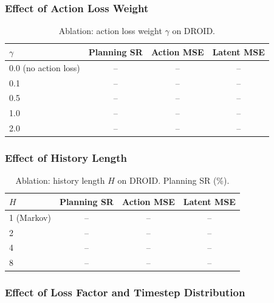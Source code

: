 \documentclass{article}
\begin{document}
\subsubsection{Effect of Action Loss Weight}

\begin{table}[t]
\centering
\caption{Ablation: action loss weight $\gamma$ on DROID.}
\label{tab:ablation_gamma}
\begin{tabular}{lccc}
\toprule
$\gamma$ & \textbf{Planning SR} & \textbf{Action MSE} & \textbf{Latent MSE} \\
\midrule
0.0 (no action loss)  & -- & -- & -- \\
0.1                    & -- & -- & -- \\
0.5                    & -- & -- & -- \\
1.0                    & -- & -- & -- \\
2.0                    & -- & -- & -- \\
\bottomrule
\end{tabular}
\end{table}

\subsubsection{Effect of History Length}

\begin{table}[t]
\centering
\caption{Ablation: history length $H$ on DROID. Planning SR (\%).}
\label{tab:ablation_history}
\begin{tabular}{lccc}
\toprule
$H$ & \textbf{Planning SR} & \textbf{Action MSE} & \textbf{Latent MSE} \\
\midrule
1 (Markov)  & -- & -- & -- \\
2           & -- & -- & -- \\
4           & -- & -- & -- \\
8           & -- & -- & -- \\
\bottomrule
\end{tabular}
\end{table}

\subsubsection{Effect of Loss Factor and Timestep Distribution}
\end{document}
